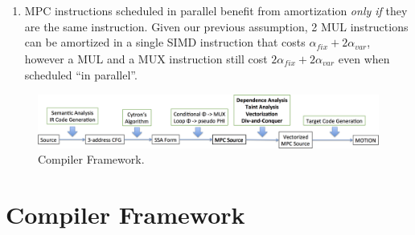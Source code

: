 \documentclass[sigconf, screen, natbib=false, dvipsnames, table]{acmart}
\theoremstyle{definition}
\begin{document}
\begin{enumerate}
\item MPC instructions scheduled in parallel benefit from amortization \emph{only if} they are the same instruction. Given our previous assumption,
2 MUL instructions can be amortized in a single SIMD instruction that costs $\alpha_\mathit{fix} + 2\alpha_\mathit{var}$, however a MUL and a MUX instruction 
still cost $2\alpha_\mathit{fix} + 2\alpha_\mathit{var}$ even when scheduled ``in parallel''. 
\end{enumerate}



\begin{figure}
  \includegraphics[width=1.0\linewidth]{figs_paper_SIMD/compiler_framework.png}
  \caption{Compiler Framework. }
  \label{fig:compiler_framework}
\end{figure}

\section{\bf Compiler Framework}
\label{sec:preliminaries}


\end{document}
